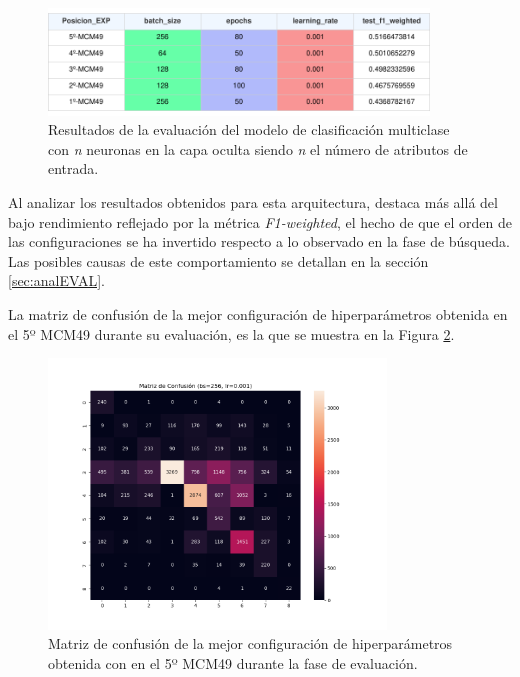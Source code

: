 \begin{figure}[H]
    \centering
    \includegraphics[width=0.9\textwidth]{./img/evaluacion/resultados/EVALMCM49.pdf}
    \caption{Resultados de la evaluación del modelo de clasificación multiclase con \textit{n} neuronas en la capa oculta siendo \textit{n} el número de atributos de entrada.}
    \label{fig:EVALMCM49}
\end{figure}

Al analizar los resultados obtenidos para esta arquitectura, destaca más allá del bajo rendimiento reflejado por la métrica \textit{F1-weighted}, el hecho de que el orden de las configuraciones se ha invertido respecto a lo observado en la fase de búsqueda. Las posibles causas de este comportamiento se detallan en la sección \ref{sec:analEVAL}.

La matriz de confusión de la mejor configuración de hiperparámetros obtenida en el 5º MCM49 durante su evaluación, es la que se muestra en la Figura \ref{fig:MC_EVAL_MCM49}.

\begin{figure}[H]
    \centering
    \includegraphics[width=0.8\textwidth]{./img/evaluacion/matrices_confusion/MC_EVAL_MCM49.png}
    \caption{Matriz de confusión de la mejor configuración de hiperparámetros obtenida con en el 5º MCM49 durante la fase de evaluación.}
    \label{fig:MC_EVAL_MCM49}
\end{figure}

